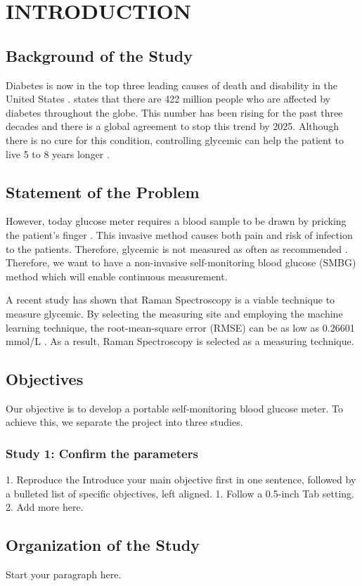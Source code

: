 \chapter{INTRODUCTION} 

\section{Background of the Study}

Diabetes is now in the top three leading causes of death and disability in the United States \citep{cdc}. 
\cite{who} states that there are 422 million people who are affected by diabetes throughout the globe. 
This number has been rising for the past three decades and there is a global agreement to stop this trend by 2025.
Although there is no cure for this condition, controlling glycemic can help the patient to live 5 to 8 years longer \citep{controlGlycemic}.



\section{Statement of the Problem}

\begin{sloppypar}
However, today glucose meter requires a blood sample to be drawn by pricking the patient's finger \citep{todayGlucoseMeter}.
This invasive method causes both pain and risk of infection to the patients. Therefore, glycemic is not measured as often as recommended \citep{NIR2017, continuous2008, continuous2018}.
Therefore, we want to have a non-invasive self-monitoring blood glucose (SMBG) method which will enable continuous measurement.
\end{sloppypar}

A recent study has shown that Raman Spectroscopy is a viable technique to measure glycemic. 
By selecting the measuring site and employing the machine learning technique, the root-mean-square error (RMSE) can be as low as 0.26601 mmol/L \citep{ramanNailFold2019}. 
As a result, Raman Spectroscopy is selected as a measuring technique.

\section{Objectives}

Our objective is to develop a portable self-monitoring blood glucose meter. To achieve this, we separate the project into three studies.

\subsection*{Study 1: Confirm the parameters}

1. Reproduce the 
Introduce your main objective first in one sentence, followed by a bulleted list of specific objectives, left aligned.
1.	Follow a 0.5-inch Tab setting.
2.	Add more here.

\section{Organization of the Study}
Start your paragraph here.